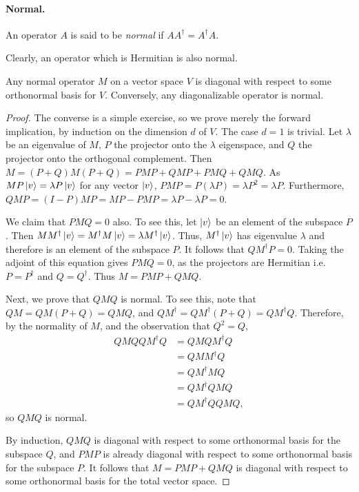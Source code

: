 \paragraph{Normal.} An operator $A$ is said to be \emph{normal} if $A A^\dagger
= A^\dagger A$.

Clearly, an operator which is Hermitian is also normal.

\begin{theorem}
  Any normal operator $M$ on a vector space $V$ is diagonal with respect to
  some orthonormal basis for $V$. Conversely, any diagonalizable operator is
  normal.
\end{theorem}
\begin{proof}
  The converse is a simple exercise, so we prove merely the forward
  implication, by induction on the dimension $d$ of $V$. The case $d = 1$ is
  trivial. Let $\lambda$ be an eigenvalue of $M$, $P$ the projector onto the
  $\lambda$ eigenspace, and $Q$ the projector onto the orthogonal complement.
  Then $M = (P + Q)M(P + Q) = PMP + QMP + PMQ + QMQ$. As $MP\ket{v} = \lambda P
  \ket{v}$ for any vector $\ket{v}$, $PMP = P(\lambda P) = \lambda P^2 =
  \lambda P$. Furthermore, $QMP = (I - P)MP = MP - PMP = \lambda P - \lambda P
  = 0$.

  We claim that $PMQ = 0$ also. To see this, let $\ket{v}$ be an element of the
  subspace $P$. Then $M M^\dagger \ket{v} = M^\dagger M \ket{v} = \lambda
  M^\dagger \ket{v}$. Thus, $M^\dagger \ket{v}$ has eigenvalue $\lambda$ and
  therefore is an element of the subspace $P$. It follows that $Q M^\dagger P =
  0$. Taking the adjoint of this equation gives $PMQ = 0$, as the projectors
  are Hermitian i.e. $P = P^\dagger$ and $Q = Q^\dagger$. Thus $M = PMP + QMQ$.

  Next, we prove that $QMQ$ is normal. To see this, note that $QM = QM(P + Q) =
  QMQ$, and $Q M^\dagger = Q M^\dagger (P+Q) = Q M^\dagger Q$. Therefore, by
  the normality of $M$, and the observation that $Q^2 = Q$, \begin{align*}
    Q M Q Q M^\dagger Q &= Q M Q M^\dagger Q \\
      &= Q M M^\dagger Q \\
      &= Q M^\dagger M Q \\
      &= Q M^\dagger Q M Q \\
      &= Q M^\dagger Q Q M Q,
  \end{align*} so $QMQ$ is normal.

  By induction, $QMQ$ is diagonal with respect to some orthonormal basis for
  the subspace $Q$, and $PMP$ is already diagonal with respect to some
  orthonormal basis for the subspace $P$. It follows that $M = PMP + QMQ$ is
  diagonal with respect to some orthonormal basis for the total vector space.
\end{proof}

